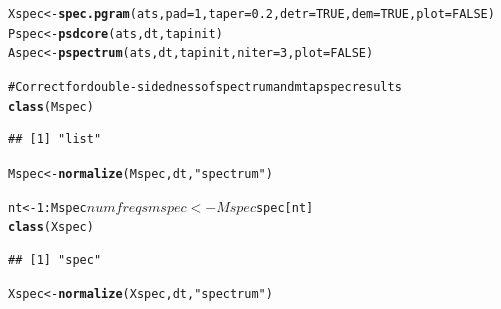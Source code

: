 \documentclass{article}\usepackage{graphicx, color}
\makeatletter
\newcommand{\hlfunctioncall}[1]{\textcolor[rgb]{0.501960784313725,0,0.329411764705882}{\textbf{#1}}}%
\newcommand{\hlstring}[1]{\textcolor[rgb]{0.6,0.6,1}{#1}}%
\newcommand{\hlcomment}[1]{\textcolor[rgb]{0.180392156862745,0.6,0.341176470588235}{#1}}%
\newenvironment{kframe}{%
 \def\at@end@of@kframe{}%
 \ifinner\ifhmode%
  \def\at@end@of@kframe{\end{minipage}}%
  \begin{minipage}{\columnwidth}%
 \fi\fi%
 \def\FrameCommand##1{\hskip\@totalleftmargin \hskip-\fboxsep
 \colorbox{shadecolor}{##1}\hskip-\fboxsep
     \hskip-\linewidth \hskip-\@totalleftmargin \hskip\columnwidth}%
 \MakeFramed {\advance\hsize-\width
   \@totalleftmargin\z@ \linewidth\hsize
   \@setminipage}}%
 {\par\unskip\endMakeFramed%
 \at@end@of@kframe}
\newenvironment{knitrout}{}{} %
\makeatother
\begin{document}
\begin{knitrout}
\color{fgcolor}\begin{kframe}
\begin{alltt}
Xspec <- \hlfunctioncall{spec.pgram}(ats, pad = 1, taper = 0.2, detr = TRUE, dem = TRUE, plot = FALSE)
Pspec <- \hlfunctioncall{psdcore}(ats, dt, tapinit)
Aspec <- \hlfunctioncall{pspectrum}(ats, dt, tapinit, niter = 3, plot = FALSE)
\end{alltt}


{\ttfamily\noindent\itshape\color{messagecolor}{\#\# Stage\ \ 0 est. (pilot)}}

{\ttfamily\noindent\itshape\color{messagecolor}{\#\# 	environment\ \ ** .rlpSpecEnv **\ \ refreshed}}

{\ttfamily\noindent\itshape\color{messagecolor}{\#\# Stage\ \ 1 est. (Ave. S.V.R. -5.5 dB)}}

{\ttfamily\noindent\itshape\color{messagecolor}{\#\# Stage\ \ 2 est. (Ave. S.V.R. -15.9 dB)}}

{\ttfamily\noindent\itshape\color{messagecolor}{\#\# Stage\ \ 3 est. (Ave. S.V.R. -22.6 dB)}}

{\ttfamily\noindent\itshape\color{messagecolor}{\#\# Normalized\ \ single-sided PSD\ \ (rlpspec)\ \ to sampling-freq.\ \ 1}}\begin{alltt}
\hlcomment{# Correct for double-sidedness of spectrum and mtapspec results}
\hlfunctioncall{class}(Mspec)
\end{alltt}
\begin{verbatim}
## [1] "list"
\end{verbatim}
\begin{alltt}
Mspec <- \hlfunctioncall{normalize}(Mspec, dt, \hlstring{"spectrum"})
\end{alltt}


{\ttfamily\noindent\itshape\color{messagecolor}{\#\# Normalized\ \ double-sided PSD\ \ (spectrum)\ \ to sampling-freq.\ \ 1}}\begin{alltt}
nt <- 1:Mspec$numfreqs
mspec <- Mspec$spec[nt]
\hlfunctioncall{class}(Xspec)
\end{alltt}
\begin{verbatim}
## [1] "spec"
\end{verbatim}
\begin{alltt}
Xspec <- \hlfunctioncall{normalize}(Xspec, dt, \hlstring{"spectrum"})
\end{alltt}


{\ttfamily\noindent\itshape\color{messagecolor}{\#\# Normalized\ \ double-sided PSD\ \ (spectrum)\ \ to sampling-freq.\ \ 1}}\end{kframe}
\end{knitrout}
\end{document}
